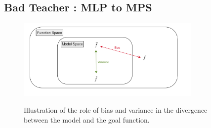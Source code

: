 \documentclass{article}
\theoremstyle{definition}
\theoremstyle{definition}
\begin{document}
\subsection{Bad Teacher : MLP to MPS}
\begin{figure}[hbt!]
    \centering
    \caption{Illustration of the role of bias and variance in the divergence between the model and the goal function.}
    \includegraphics[width=0.8\textwidth]{images/2023-04-21-16-47-59.png}
    \label{fig:function_space}
\end{figure}
\end{document}
